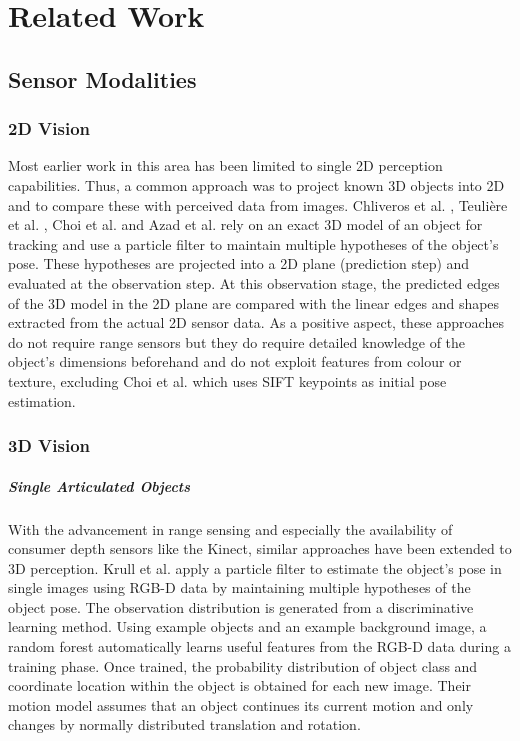 \chapter{Related Work}

\section{Sensor Modalities}

\subsection{2D Vision}
Most earlier work in this area has been limited to single 2D perception capabilities. Thus, a common approach was to project known 3D objects into 2D and to compare these with perceived data from images. Chliveros et al. \cite{Chliveros2013}, Teuli\`ere et al. \cite{Teuliere2010}, Choi et al. \cite{Choi2012} and Azad et al. \cite{Azad2011} rely on an exact 3D model of an object for tracking and use a particle filter to maintain multiple hypotheses of the object's pose. These hypotheses are projected into a 2D plane (prediction step) and evaluated at the observation step. At this observation stage, the predicted edges of the 3D model in the 2D plane are compared with the linear edges and shapes extracted from the actual 2D sensor data. As a positive aspect, these approaches do not require range sensors but they do require detailed knowledge of the object's dimensions beforehand and do not exploit features from colour or texture, excluding Choi et al. which uses SIFT keypoints as initial pose estimation.

\subsection{3D Vision}
\label{sec:3d_vision}

\paragraph{Single Articulated Objects}
With the advancement in range sensing and especially the availability of consumer depth sensors like the Kinect, similar approaches have been extended to 3D perception. Krull et al. \cite{Krull2015} apply a particle filter to estimate the object's pose in single images using RGB-D data by maintaining multiple hypotheses of the object pose. The observation distribution is generated from a discriminative learning method. Using example objects and an example background image, a random forest automatically learns useful features from the RGB-D data during a training phase. Once trained, the probability distribution of object class and coordinate location within the object is obtained for each new image. Their motion model assumes that an object continues its current motion and only changes by normally distributed translation and rotation.

